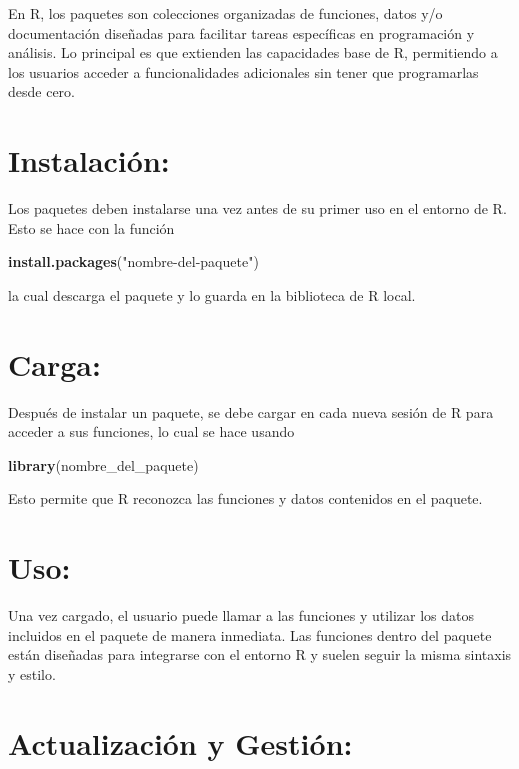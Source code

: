 \documentclass[
]{book}
\newenvironment{Shaded}{\begin{snugshade}}{\end{snugshade}}
\newcommand{\FunctionTok}[1]{\textcolor[rgb]{0.13,0.29,0.53}{\textbf{#1}}}
\newcommand{\NormalTok}[1]{#1}
\newcommand{\StringTok}[1]{\textcolor[rgb]{0.31,0.60,0.02}{#1}}
\begin{document}
En R, los paquetes son colecciones organizadas de funciones, datos y/o documentación diseñadas para facilitar tareas específicas en programación y análisis. Lo principal es que extienden las capacidades base de R, permitiendo a los usuarios acceder a funcionalidades adicionales sin tener que programarlas desde cero.

\section{Instalación:}\label{instalaciuxf3n}

Los paquetes deben instalarse una vez antes de su primer uso en el entorno de R. Esto se hace con la función

\begin{Shaded}
\begin{Highlighting}[]
\FunctionTok{install.packages}\NormalTok{(}\StringTok{"nombre{-}del{-}paquete"}\NormalTok{)}
\end{Highlighting}
\end{Shaded}

la cual descarga el paquete y lo guarda en la biblioteca de R local.

\section{Carga:}\label{carga}

Después de instalar un paquete, se debe cargar en cada nueva sesión de R para acceder a sus funciones, lo cual se hace usando

\begin{Shaded}
\begin{Highlighting}[]
\FunctionTok{library}\NormalTok{(nombre\_del\_paquete)}
\end{Highlighting}
\end{Shaded}

Esto permite que R reconozca las funciones y datos contenidos en el paquete.

\section{Uso:}\label{uso}

Una vez cargado, el usuario puede llamar a las funciones y utilizar los datos incluidos en el paquete de manera inmediata. Las funciones dentro del paquete están diseñadas para integrarse con el entorno R y suelen seguir la misma sintaxis y estilo.

\section{Actualización y Gestión:}\label{actualizaciuxf3n-y-gestiuxf3n}
\end{document}
